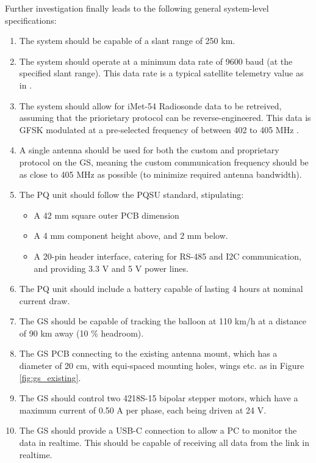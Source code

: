 Further investigation finally leads to the following general system-level specifications:
\begin{enumerate}
    \item The system should be capable of a slant range of 250 km.
    \item The system should operate at a minimum data rate of 9600 baud (at the specified slant range). This data rate is a typical satellite telemetry value as in \cite{paper-deployableAntenna}.
    \item The system should allow for iMet-54 Radiosonde data to be retreived, assuming that the priorietary protocol can be reverse-engineered. This data is GFSK modulated at a pre-selected frequency of between 402 to 405 MHz \cite{datasheet-iMet54}.
    \item A single antenna should be used for both the custom and proprietary protocol on the GS, meaning the custom communication frequency should be as close to 405 MHz as possible (to minimize required antenna bandwidth).
    \item The PQ unit should follow the PQSU standard, stipulating:
    \begin{itemize}
        \item A 42 mm square outer PCB dimension
        \item A 4 mm component height above, and 2 mm below.
        \item A 20-pin header interface, catering for RS-485 and I2C communication, and providing 3.3 V and 5 V power lines.
    \end{itemize}
    \item The PQ unit should include a battery capable of lasting 4 hours at nominal current draw.
    \item The GS should be capable of tracking the balloon at 110 km/h at a distance of 90 km away (10 \% headroom).
    \item The GS PCB connecting to the existing antenna mount, which has a diameter of 20 cm, with equi-spaced mounting holes, wings etc. as in Figure \ref{fig:gs_existing}.
    \item The GS should control two 4218S-15 bipolar stepper motors, which have a maximum current of 0.50 A per phase, each being driven at 24 V.
    \item The GS should provide a USB-C connection to allow a PC to monitor the data in realtime. This should be capable of receiving all data from the link in realtime.
\end{enumerate}